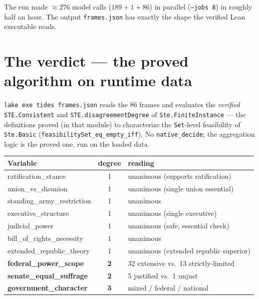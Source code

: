 \documentclass[11pt]{article}
\newcommand{\lean}[1]{\texttt{#1}}
\begin{document}
The run made $\approx 276$ model calls ($189+1+86$) in parallel
(\lean{--jobs 8}) in roughly half an hour. The output \lean{frames.json} has
exactly the shape the verified Lean executable reads.

\section{The verdict --- the proved algorithm on runtime data}

\lean{lake exe tides frames.json} reads the 86 frames and evaluates the
\emph{verified} \lean{STE.Consistent} and \lean{STE.disagreementDegree} of
\lean{Ste.FiniteInstance} --- the definitions proved (in that module) to
characterize the \lean{Set}-level feasibility of \lean{Ste.Basic}
(\lean{feasibilitySet\_eq\_empty\_iff}). No \lean{native\_decide}; the
aggregation logic is the proved one, run on the loaded data.

\begin{center}\small
\begin{tabular}{@{}l c l@{}}
\toprule
Variable & degree & reading \\
\midrule
ratification\_stance        & 1 & unanimous (supports ratification) \\
union\_vs\_disunion          & 1 & unanimous (single union essential) \\
standing\_army\_restriction  & 1 & unanimous \\
executive\_structure        & 1 & unanimous (single executive) \\
judicial\_power             & 1 & unanimous (safe, essential check) \\
bill\_of\_rights\_necessity  & 1 & unanimous \\
extended\_republic\_theory   & 1 & unanimous (extended republic superior) \\
\textbf{federal\_power\_scope}     & \textbf{2} & 32 extensive vs.\ 13 strictly-limited \\
\textbf{senate\_equal\_suffrage}   & \textbf{2} & 5 justified vs.\ 1 unjust \\
\textbf{government\_character}     & \textbf{3} & mixed / federal / national \\
\bottomrule
\end{tabular}
\end{center}
\end{document}
